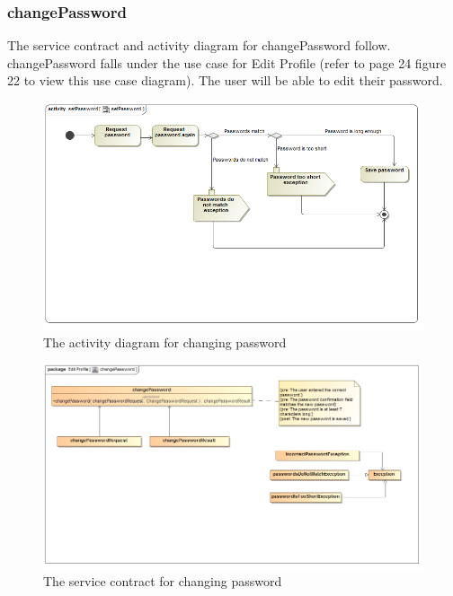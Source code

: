 \documentclass[a4paper,12pt]{report}
\begin{document}
\subsubsection{changePassword}
The service contract and activity diagram for changePassword follow. changePassword falls under the use case for Edit Profile (refer to page 24 figure 22 to view this use case diagram). The user will be able to edit their password.
\begin{figure}[H]
  \centering
    \includegraphics[width=1.0\textwidth]{../Diagrams/ManageProfile/ActivityDiagrams/setPassword1.png}
    \caption{The activity diagram for changing password} 
\end{figure}
	
\begin{figure}[H]
	\centering
	\includegraphics[width=1.0\textwidth]{../Diagrams/ManageProfile/serviceContracts/changePasswordServiceContract.png}
	\caption{The service contract for changing password}
\end{figure}
\end{document}
